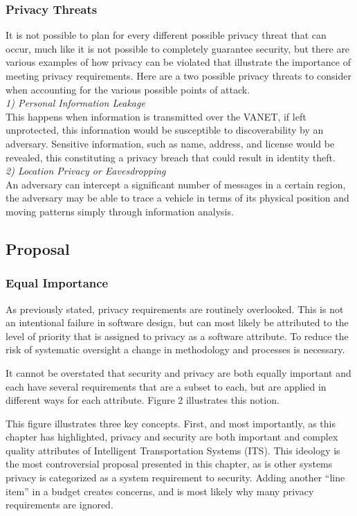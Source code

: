 \documentclass[conference,compsoc]{IEEEtran}
\begin{document}
\subsubsection{Privacy Threats}
It is not possible to plan for every different possible privacy threat that can occur, much like it is not possible to completely guarantee security, but there are various examples of how privacy can be violated that illustrate the importance of meeting privacy requirements. Here are a two possible privacy threats to consider when accounting for the various possible points of attack. \\
\emph{1) \indent Personal Information Leakage}\\
\indent This happens when information is transmitted over the VANET, if left unprotected, this information would be susceptible to discoverability by an adversary. Sensitive information, such as name, address, and license would be revealed, this constituting a privacy breach that could result in identity theft.\\
\emph{2) \indent Location Privacy or Eavesdropping}\\
\indent An adversary can intercept a significant number of messages in a certain region, the adversary may be able to trace a vehicle in terms of its physical position and moving patterns simply through information analysis.

\subsection{Proposal}
\subsubsection{Equal Importance}
As previously stated, privacy requirements are routinely overlooked. This is not an intentional failure in software design, but can most likely be attributed to the level of priority that is assigned to privacy as a software attribute. To reduce the risk of systematic oversight a change in methodology and processes is necessary. 

It cannot be overstated that security and privacy are both equally important and each have several requirements that are a subset to each, but are applied in different ways for each attribute. Figure 2 illustrates this notion.

This figure illustrates three key concepts. First, and most importantly, as this chapter has highlighted, privacy and security are both important and complex quality attributes of Intelligent Transportation Systems (ITS). This ideology is the most controversial proposal presented in this chapter, as is other systems privacy is categorized as a system requirement to security. Adding another “line item” in a budget creates concerns, and is most likely why many privacy requirements are ignored. 
\end{document}
